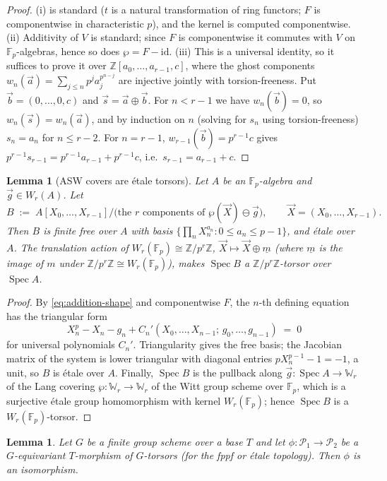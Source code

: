 \documentclass[11pt]{article}
\newcommand{\cP}{\mathcal{P}}
\newcommand{\Z}{\mathbb{Z}}
\newcommand{\F}{\mathbb{F}}
\newcommand{\bW}{\mathbb{W}}
\DeclareMathOperator{\Spec}{Spec}
\newcommand{\AS}{\wp}
\newcommand{\va}{\vec a}
\newcommand{\vX}{\vec X}
\theoremstyle{plain}
\newtheorem{lemma}[theorem]{Lemma}
\theoremstyle{definition}
\begin{document}
\begin{proof}
(i) is standard ($t$ is a natural transformation of ring functors; $F$ is componentwise
in characteristic $p$), and the kernel is computed componentwise.
(ii) Additivity of $V$ is standard; since $F$ is componentwise it commutes with $V$ on
$\F_p$-algebras, hence so does $\AS=F-\mathrm{id}$.
(iii) This is a universal identity, so it suffices to prove it over
$\Z[a_0,\dots,a_{r-1},c]$, where the ghost components
$w_n(\va)=\sum_{j\le n}p^ja_j^{p^{n-j}}$ are injective jointly with torsion-freeness.
Put $\vec b=(0,\dots,0,c)$ and $\vec s=\va\oplus\vec b$. For $n<r-1$ we have
$w_n(\vec b)=0$, so $w_n(\vec s)=w_n(\va)$, and by induction on $n$ (solving for $s_n$
using torsion-freeness) $s_n=a_n$ for $n\le r-2$. For $n=r-1$,
$w_{r-1}(\vec b)=p^{r-1}c$ gives
$p^{r-1}s_{r-1}=p^{r-1}a_{r-1}+p^{r-1}c$, i.e.\ $s_{r-1}=a_{r-1}+c$.
\end{proof}

\begin{lemma}[ASW covers are \'etale torsors]\label{lem:asw-etale}
Let $A$ be an $\F_p$-algebra and $\vec g\in W_r(A)$. Let
\[
B \;:=\; A[X_0,\dots,X_{r-1}]\big/\big(\text{the $r$ components of } \AS(\vX)\ominus\vec g\big),
\qquad \vX=(X_0,\dots,X_{r-1}).
\]
Then $B$ is finite free over $A$ with basis
$\{\prod_{n}X_n^{a_n}:0\le a_n\le p-1\}$, and \'etale over $A$. The translation action
of $W_r(\F_p)\cong\Z/p^r\Z$, $\vX\mapsto\vX\oplus\underline m$ (where $\underline m$ is
the image of $m$ under $\Z/p^r\Z\cong W_r(\F_p)$), makes $\Spec B$ a $\Z/p^r\Z$-torsor
over $\Spec A$.
\end{lemma}

\begin{proof}
By \eqref{eq:addition-shape} and componentwise $F$, the $n$-th defining equation has the
triangular form
\[
X_n^p - X_n - g_n + C_n'(X_0,\dots,X_{n-1};\,g_0,\dots,g_{n-1}) \;=\; 0
\]
for universal polynomials $C_n'$. Triangularity gives the free basis; the Jacobian
matrix of the system is lower triangular with diagonal entries
$pX_n^{p-1}-1=-1$, a unit, so $B$ is \'etale over $A$. Finally, $\Spec B$ is the
pullback along $\vec g\colon\Spec A\to\bW_r$ of the Lang covering
$\AS\colon\bW_r\to\bW_r$ of the Witt group scheme over $\F_p$, which is a surjective
\'etale group homomorphism with kernel $W_r(\F_p)$; hence $\Spec B$ is a
$W_r(\F_p)$-torsor.
\end{proof}

\begin{lemma}\label{lem:torsor-mor}
Let $G$ be a finite group scheme over a base $T$ and let $\phi\colon\cP_1\to\cP_2$ be a
$G$-equivariant $T$-morphism of $G$-torsors (for the fppf or \'etale topology). Then
$\phi$ is an isomorphism.
\end{lemma}
\end{document}
